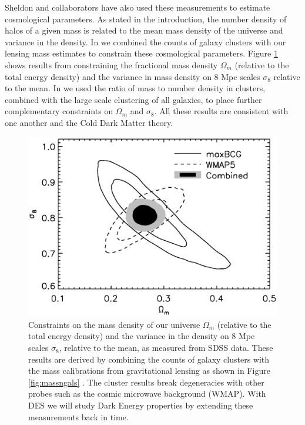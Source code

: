 \documentclass[12pt]{article}
\begin{document}
Sheldon and collaborators have also used these measurements to estimate
cosmological parameters.  As stated in the introduction, the number density of
halos of a given mass is related to the mean mass density of the universe and
variance in the density.  In \cite{RozoCosmo09} we combined the counts of
galaxy clusters with our lensing mass estimates to constrain these cosmological
parameters.  Figure \ref{fig:omegasigma8} shows results from \cite{RozoCosmo09}
constraining the fractional mass density $\Omega_m$ (relative to the total
energy density) and the variance in mass density on 8 Mpc scales $\sigma_8$
relative to the mean. In \cite{TinkerM2N2012} we used the ratio of mass to
number density in clusters, combined with the large scale clustering of all
galaxies, to place further complementary constraints on $\Omega_m$ and
$\sigma_8$.  All these results are consistent with one another and the Cold
Dark Matter theory.

\begin{figure}[p] 
\centering 
\includegraphics[scale=0.6]{s8_Om.ps}

\caption{Constraints on the mass density of our universe $\Omega_m$ (relative
    to the total energy density) and the variance in the density on 8 Mpc
    scales $\sigma_8$, relative to the mean, as measured from SDSS data.  These
    results \cite{RozoCosmo09} are derived by combining the counts of galaxy
    clusters with the mass calibrations from gravitational lensing as shown in
    Figure \ref{fig:massngals} \cite{SheldonLensing07,JohnstonLensing07}.  The
    cluster results break degeneracies with other probes such as the cosmic
microwave background (WMAP).  With DES we will study Dark Energy properties by
extending these measurements back in time.  \label{fig:omegasigma8}} 

\end{figure}
\end{document}
